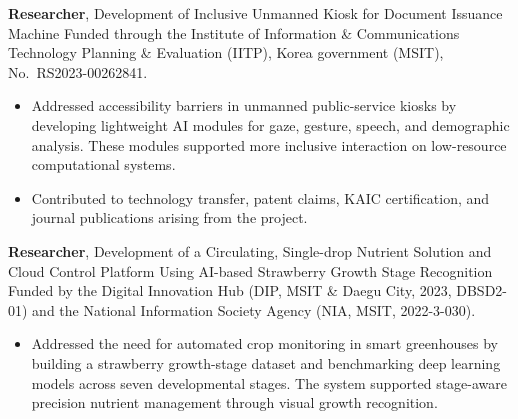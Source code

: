 \documentclass[11pt,a4paper,sans]{moderncv} %
\begin{document}
{\textbf{Researcher}, Development of Inclusive Unmanned Kiosk for Document Issuance Machine}
{}
{}
{}
{Funded through the Institute of Information \& Communications Technology Planning \& Evaluation (IITP), Korea government (MSIT), No.\ RS2023-00262841.}
\begin{itemize}
   \vspace{-0.3cm}\item Addressed accessibility barriers in unmanned public-service kiosks by developing lightweight AI modules for gaze, gesture, speech, and demographic analysis. These modules supported more inclusive interaction on low-resource computational systems.
   \vspace{-0.2cm}\item Contributed to technology transfer, patent claims, KAIC certification, and journal publications arising from the project.
\end{itemize}

{\textbf{Researcher}, Development of a Circulating, Single-drop Nutrient Solution and Cloud Control Platform Using AI-based Strawberry Growth Stage Recognition}
{}
{}
{}
{Funded by the Digital Innovation Hub (DIP, MSIT \& Daegu City, 2023, DBSD2-01) and the National Information Society Agency (NIA, MSIT, 2022-3-030).}
\begin{itemize}
   \vspace{-0.3cm}\item Addressed the need for automated crop monitoring in smart greenhouses by building a strawberry growth-stage dataset and benchmarking deep learning models across seven developmental stages. The system supported stage-aware precision nutrient management through visual growth recognition.
\end{itemize}

\end{document}
